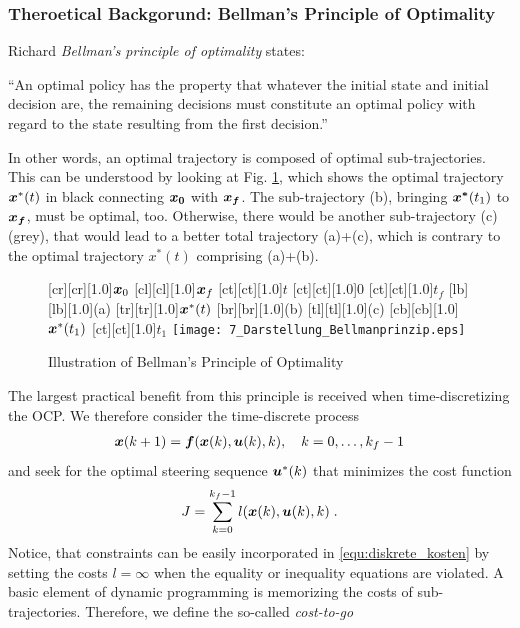 \subsubsection{Theroetical Backgorund: Bellman’s Principle of Optimality}\label{S:57.3.3.1}
Richard \emph{Bellman’s principle of optimality} states:

\begin{mydef}
“An optimal policy has the property that whatever the initial state and initial decision are, the remaining decisions must constitute an optimal policy with regard to the state resulting from the first decision.” 
\end{mydef}
In other words, an optimal trajectory is composed of optimal sub-trajectories. This can be understood by looking at Fig. \ref{fig:Darstellung_Bellmanprinzip}, which shows the optimal trajectory $\boldsymbol{x}^\ast (t)$ in black connecting $\boldsymbol{x_0}$ with $\boldsymbol{x_f}$. The sub-trajectory (b), bringing $\boldsymbol{x^\ast} (t_1 )$ to $\boldsymbol{x_f}$, must be optimal, too. Otherwise, there would be another sub-trajectory (c) (grey), that would lead to a better total trajectory (a)+(c), which is contrary to the optimal trajectory $x^\ast (t)$ comprising (a)+(b).
\begin{figure}[h]
	[cr][cr][1.0]{$\boldsymbol{x}_0$}
	[cl][cl][1.0]{$\boldsymbol{x}_f$}
	[ct][ct][1.0]{$t$}
	[ct][ct][1.0]{$0$}
	[ct][ct][1.0]{$t_f$}
	[lb][lb][1.0]{(a)}
	[tr][tr][1.0]{$\boldsymbol{x}^\ast(t)$}
	[br][br][1.0]{(b)}
	[tl][tl][1.0]{(c)}
	[cb][cb][1.0]{$\boldsymbol{x}^\ast(t_1)$}
	[ct][ct][1.0]{$t_1$}
	\centering
 \texttt{[image: 7\_Darstellung\_Bellmanprinzip.eps]}
	\caption[Bellman’s Principle of Optimality]{Illustration of Bellman’s Principle of Optimality} 
	\label{fig:Darstellung_Bellmanprinzip}
\end{figure} 
The largest practical benefit from this principle is received when time-discretizing the OCP. We therefore consider the time-discrete process
\begin{align} \label{equ:diskreter_prozess}
	\bs x(k+1) = \bs f(\bs x(k), \bs u(k), k), \quad k=0,\ldots, k_f-1
\end{align}
and seek for the optimal steering sequence $\boldsymbol{u}^\ast (k)$ that minimizes the cost function
\begin{align}
	J = \sum_{k=0}^{k_f-1} l(\bs x(k), \bs u(k),k) \;. \label{equ:diskrete_kosten} %
\end{align}
Notice, that constraints can be easily incorporated in \eqref{equ:diskrete_kosten} by setting the costs $l=\infty$ when the equality or inequality equations are violated.
A basic element of dynamic programming is memorizing the costs of sub-trajectories. Therefore, we define the so-called \emph{cost-to-go}

